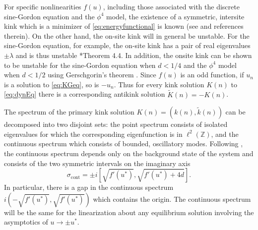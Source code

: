 \documentclass[12pt,reqno]{amsart}
\def\Z{{\mathbb Z}}
\begin{document}
For specific nonlinearities $f(u)$, including those associated with the discrete sine-Gordon equation and the $\phi^4$ model, the existence of a symmetric, intersite kink which is a minimizer of \cref{eq:energyfunctional} is known (see \cites{KevrekidisWeinstein2000,SGchapter} and references therein). On the other
hand, the on-site kink will in general be unstable. For the sine-Gordon equation, for example, the on-site kink has a pair of real eigenvalues $\pm \lambda$ and is thus unstable \cite{Kapitula2001}*{Theorem 4.4}. In addition, the onsite kink can be shown to be unstable for the sine-Gordon equation when $d < 1/4$ and the  $\phi^4$ model when $d < 1/2$ using Gerschgorin’s theorem \cite{SGchapter}. Since $f(u)$ is an odd function, if $u_n$ is a solution to \cref{eq:KGeq}, so is $-u_n$. Thus for every kink solution $K(n)$ to \cref{eq:dynEq} there is a corresponding antikink solution $\tilde{K}(n) = -K(n)$.

The spectrum of the primary kink solution $K(n) = (k(n),\tilde{k}(n))$ can be decomposed into two disjoint sets: the point spectrum consists of isolated eigenvalues for which the corresponding eigenfunction is in $\ell^2(\Z)$, and the continuous spectrum which consists of bounded, oscillatory modes. Following \cite{KevrekidisWeinstein2000}, the continuous spectrum depends only on the background state of the system and consists of the two symmetric intervals on the imaginary axis
\begin{equation}\label{eq:contspec}
	\sigma_{\text{cont}} = \pm i \left[\sqrt{f'(u^*)}, \sqrt{f'(u^*) + 4d}\right].
\end{equation}
In particular, there is a gap in the continuous spectrum $i\left(-\sqrt{f'(u^*)},\sqrt{f'(u^*)}\right)$ which contains the origin. The continuous spectrum will be the same for the linearization about any equilibrium solution involving the asymptotics of $u \rightarrow \pm u^*$.
\end{document}
